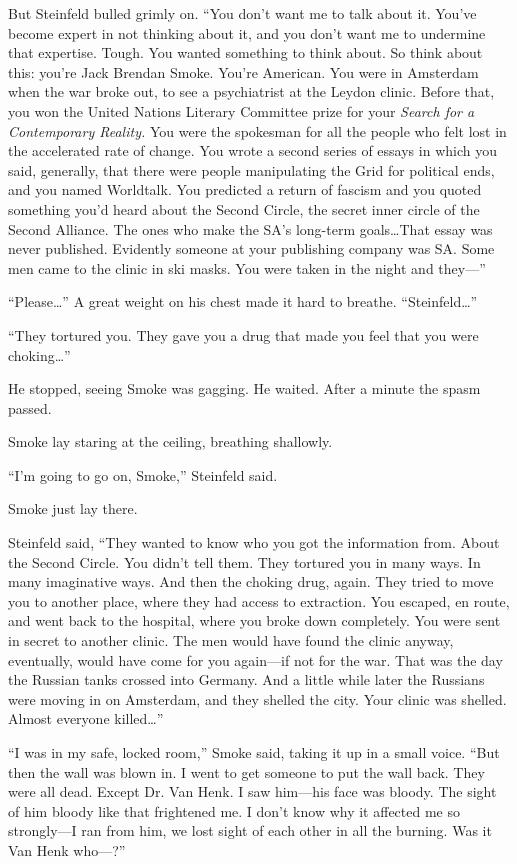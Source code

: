 But Steinfeld bulled grimly on. ``You don't want me to talk about it. You've become expert in not thinking about it, and you don't want me to undermine that expertise. Tough. You wanted something to think about. So think about this: you're Jack Brendan Smoke. You're American. You were in Amsterdam when the war broke out, to see a psychiatrist at the Leydon clinic. Before that, you won the United Nations Literary Committee prize for your \textit{Search for a Contemporary Reality.} You were the spokesman for all the people who felt lost in the accelerated rate of change. You wrote a second series of essays in which you said, generally, that there were people manipulating the Grid for political ends, and you named Worldtalk. You predicted a return of fascism and you quoted something you'd heard about the Second Circle, the secret inner circle of the Second Alliance. The ones who make the SA's long-term goals\ldots That essay was never published. Evidently someone at your publishing company was SA. Some men came to the clinic in ski masks. You were taken in the night and they---''

``Please\ldots '' A great weight on his chest made it hard to breathe. ``Steinfeld\ldots ''

``They tortured you. They gave you a drug that made you feel that you were choking\ldots ''

He stopped, seeing Smoke was gagging. He waited. After a minute the spasm passed.

Smoke lay staring at the ceiling, breathing shallowly.

``I'm going to go on, Smoke,'' Steinfeld said.

Smoke just lay there.

Steinfeld said, ``They wanted to know who you got the information from. About the Second Circle. You didn't tell them. They tortured you in many ways. In many imaginative ways. And then the choking drug, again. They tried to move you to another place, where they had access to extraction. You escaped, en route, and went back to the hospital, where you broke down completely. You were sent in secret to another clinic. The men would have found the clinic anyway, eventually, would have come for you again---if not for the war. That was the day the Russian tanks crossed into Germany. And a little while later the Russians were moving in on Amsterdam, and they shelled the city. Your clinic was shelled. Almost everyone killed\ldots ''

``I was in my safe, locked room,'' Smoke said, taking it up in a small voice. ``But then the wall was blown in. I went to get someone to put the wall back. They were all dead. Except Dr. Van Henk. I saw him---his face was bloody. The sight of him bloody like that frightened me. I don't know why it affected me so strongly---I ran from him, we lost sight of each other in all the burning. Was it Van Henk who---?''

